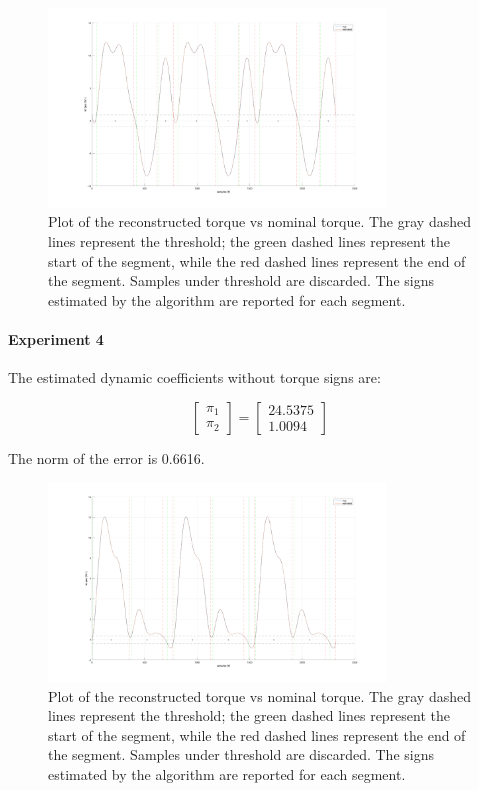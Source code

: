 \documentclass{article}
\begin{document}
\begin{figure}[!htbp]
\centering
\includegraphics[width=0.8\textwidth]{images/1-dof/results_experiment3.png}
\caption{Plot of the reconstructed torque vs nominal torque. The gray dashed lines represent the threshold; the green dashed lines represent the start of the segment, while the red dashed lines represent the end of the segment. Samples under threshold are discarded. The signs estimated by the algorithm are reported for each segment.}
\end{figure}
\FloatBarrier

\paragraph{Experiment 4} The estimated dynamic coefficients without torque signs are:

\[\begin{bmatrix}
\pi_1  \\ \pi_2 
\end{bmatrix}=\begin{bmatrix}
24.5375 \\ 1.0094
\end{bmatrix}\]

The norm of the error is 0.6616.

\begin{figure}[!htbp]
\centering
\includegraphics[width=0.8\textwidth]{images/1-dof/results_experiment4.png}
\caption{Plot of the reconstructed torque vs nominal torque. The gray dashed lines represent the threshold; the green dashed lines represent the start of the segment, while the red dashed lines represent the end of the segment. Samples under threshold are discarded. The signs estimated by the algorithm are reported for each segment.}
\end{figure}
\FloatBarrier
\end{document}
